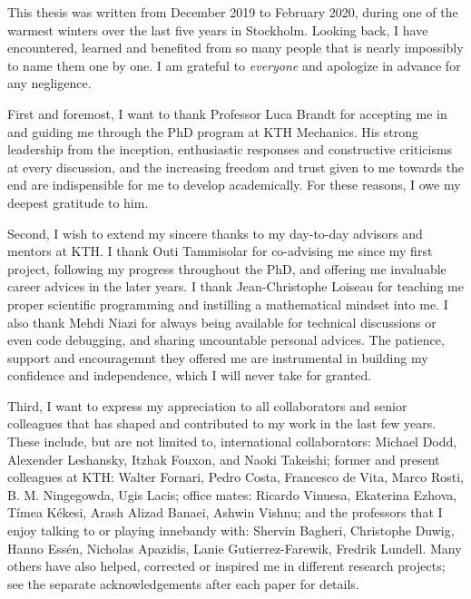 \begin{acknowledgements}

  This thesis was written from December 2019 to February 2020, during one of the warmest winters over the last five years in Stockholm.
  Looking back, I have encountered, learned and benefited from so many people that is nearly impossibly to name them one by one.
  I am grateful to \emph{everyone} and apologize in advance for any negligence.

  First and foremost, I want to thank Professor Luca Brandt for accepting me in and guiding me through the PhD program at KTH Mechanics.
  His strong leadership from the inception,
  enthusiastic responses and constructive criticisms at every discussion,
  and the increasing freedom and trust given to me towards the end are indispensible for me to develop academically.
  For these reasons, I owe my deepest gratitude to him.

  Second, I wish to extend my sincere thanks to my day-to-day advisors and mentors at KTH.
  I thank Outi Tammisolar for co-advising me since my first project, following my progress throughout the PhD,
  and offering me invaluable career advices in the later years.
  I thank Jean-Christophe Loiseau for teaching me proper scientific programming and instilling a mathematical mindset into me.
  I also thank Mehdi Niazi for always being available for technical discussions or even code debugging, and sharing uncountable personal advices.
  The patience, support and encouragemnt they offered me are instrumental in building my confidence and independence, which I will never take for granted.

  Third, I want to express my appreciation to all collaborators and senior colleagues that has shaped and contributed to my work in the last few years.
  These include, but are not limited to, international collaborators: Michael Dodd, Alexender Leshansky, Itzhak Fouxon, and Naoki Takeishi;
  former and present colleagues at KTH: Walter Fornari, Pedro Costa, Francesco de Vita, Marco Rosti, B. M. Ningegowda, Ugis Lacis;
  office mates: Ricardo Vinuesa, Ekaterina Ezhova, Tímea Kékesi, Arash Alizad Banaei, Ashwin Vishnu;
  and the professors that I enjoy talking to or playing innebandy with:
  Shervin Bagheri, Christophe Duwig, Hanno Essén, Nicholas Apazidis, Lanie Gutierrez-Farewik, Fredrik Lundell.
  Many others have also helped, corrected or inspired me in different research projects; see the separate acknowledgements after each paper for details.
  

\end{acknowledgements}
